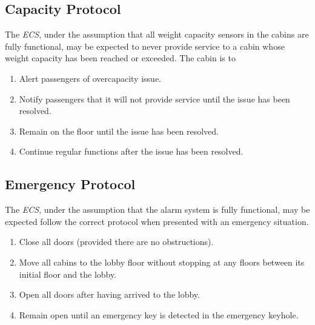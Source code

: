 \documentclass[12pt]{article}
\begin{document}
\subsection{Capacity Protocol} The \textit{ECS}, under the assumption that all weight capacity sensors in the cabins are fully functional, may be expected to never provide service to a cabin whose weight capacity has been reached or exceeded. The cabin is to
\begin{enumerate}
\item Alert passengers of overcapacity issue.
\item Notify passengers that it will not provide service until the issue has been resolved.
\item Remain on the floor until the issue has been resolved.
\item Continue regular functions after the issue has been resolved.
\end{enumerate}

\subsection{Emergency Protocol} The \textit{ECS}, under the assumption that the alarm system is fully functional, may be expected follow the correct protocol when presented with an emergency situation.
\begin{enumerate}
\item Close all doors (provided there are no obstructions).
\item Move all cabins to the lobby floor without stopping at any floors between its initial floor and the lobby.
\item Open all doors after having arrived to the lobby.
\item Remain open until an emergency key is detected in the emergency keyhole.
\end{enumerate}
\end{document}
